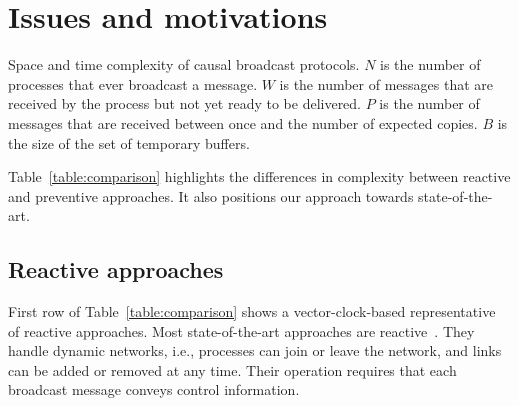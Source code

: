 
\section{Issues and motivations}
\label{sec:motivations}

\begin{table}
  \caption{\label{table:comparison} Space and time complexity of causal broadcast protocols. $N$ is the number of processes that ever broadcast a message. $W$ is the number of messages that are received by the process but not yet ready to be delivered.
    $P$ is the number of messages that are received between once and the number of expected copies.
    $B$ is the size of the set of temporary buffers.}
  
\end{table}

Table~\ref{table:comparison} highlights the differences in complexity between
reactive and preventive approaches. It also positions our approach towards
state-of-the-art.

\subsection{Reactive approaches}

First row of Table~\ref{table:comparison} shows a vector-clock-based
representative~\cite{schwarz1994detecting} of reactive approaches. Most
state-of-the-art approaches are
reactive~\cite{almeida2008interval,fidge1988timestamps,hadzilacos1993fault,mattern1989virtual,mostefaoui2017probabilistic,singhal1992efficient}. They
handle dynamic networks, i.e., processes can join or leave the network, and
links can be added or removed at any time. Their operation requires that each
broadcast message conveys control information.



